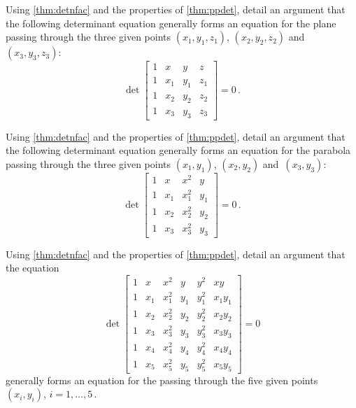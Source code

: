 





\begin{exercise} \label{ex:} 
Using \autoref{thm:detnfac} and the properties of \autoref{thm:ppdet}, detail an argument that the following determinant equation generally forms an equation for the plane passing through the three given points \((x_1,y_1,z_1)\), \((x_2,y_2,z_2)\) and~\((x_3,y_3,z_3)\):
\begin{equation*}
\det\begin{bmatrix} 1&x&y&z
\\1&x_1&y_1&z_1
\\1&x_2&y_2&z_2
\\1&x_3&y_3&z_3 \end{bmatrix}=0\,.
\end{equation*}

\end{exercise}



\begin{exercise} \label{ex:} 
Using \autoref{thm:detnfac} and the properties of \autoref{thm:ppdet}, detail an argument that the following determinant equation generally forms an equation for the parabola passing through the three given points \((x_1,y_1)\), \((x_2,y_2)\) and~\((x_3,y_3)\):
\begin{equation*}
\det\begin{bmatrix} 1&x&x^2&y
\\1&x_1&x_1^2&y_1
\\1&x_2&x_2^2&y_2
\\1&x_3&x_3^2&y_3 \end{bmatrix}=0\,.
\end{equation*}
\end{exercise}






\begin{exercise} \label{ex:} 
Using \autoref{thm:detnfac} and the properties of \autoref{thm:ppdet}, detail an argument that the equation
\begin{equation*}
\det\begin{bmatrix} 1&x&x^2&y&y^2&xy
\\1&x_1&x_1^2&y_1&y_1^2&x_1y_1
\\1&x_2&x_2^2&y_2&y_2^2&x_2y_2
\\1&x_3&x_3^2&y_3&y_3^2&x_3y_3 
\\1&x_4&x_4^2&y_4&y_4^2&x_4y_4 
\\1&x_5&x_5^2&y_5&y_5^2&x_5y_5 
\end{bmatrix}=0
\end{equation*}
generally forms an equation for the  passing through the five given points \((x_i,y_i)\), \(i=1,\ldots,5\)\,.
\end{exercise}









\begin{comment}%
why, what caused X?
how did X occur?
what-if? what-if-not?
how does X compare with Y?
what is the evidence for X?
why is X important?
\end{comment}


